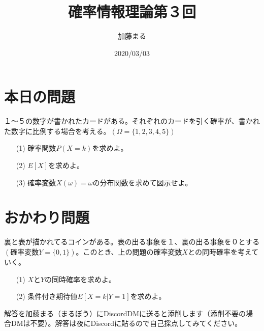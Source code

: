 \documentclass[a4j,uplatex]{jsarticle}
\title{確率情報理論第３回}
\author{加藤まる}
\date{2020/03/03}
\begin{document}
\maketitle

\section*{本日の問題}
１〜５の数字が書かれたカードがある。それぞれのカードを引く確率が、書かれた数字に比例する場合を考える。$(\Omega=\{ 1,2,3,4,5\})$
\begin{itemize}
  \item[(1)] 確率関数$P(X=k)$を求めよ。
  \item[(2)] $E[X]$を求めよ。
  \item[(3)] 確率変数$X(\omega)=\omega$の分布関数を求めて図示せよ。
\end{itemize}

\section*{おかわり問題}
裏と表が描かれてるコインがある。表の出る事象を１、裏の出る事象を０とする$(確率変数Y=\{ 0,1\})$。このとき、上の問題の確率変数$X$との同時確率を考えていく。
\begin{itemize}
  \item[(1)] $X$と$Y$の同時確率を求めよ。
  \item[(2)] 条件付き期待値$E[X=k|Y=1]$を求めよ。
\end{itemize}

解答を加藤まる（まるぼう）にDiscordDMに送ると添削します（添削不要の場合DMは不要）。解答は夜にDiscordに貼るので自己採点してみてください。
\end{document}
